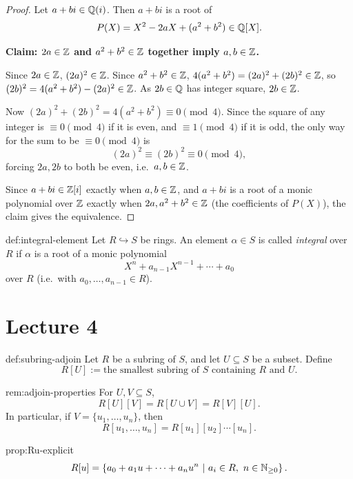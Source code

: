 \begin{proof}
Let $a + bi \in \mathbb{Q}(i)$. Then $a+bi$ is a root of
\[
P(X) = X^2 - 2aX + (a^2+b^2) \in \mathbb{Q}[X].
\]

\textbf{Claim: $2a \in \mathbb{Z}$ and $a^2+b^2 \in \mathbb{Z}$ together imply $a, b \in \mathbb{Z}$.}

Since $2a \in \mathbb{Z}$, $(2a)^2 \in \mathbb{Z}$. Since $a^2+b^2 \in \mathbb{Z}$, $4(a^2+b^2) = (2a)^2 + (2b)^2 \in \mathbb{Z}$, so $(2b)^2 = 4(a^2+b^2) - (2a)^2 \in \mathbb{Z}$. As $2b \in \mathbb{Q}$ has integer square, $2b \in \mathbb{Z}$.

Now $(2a)^2 + (2b)^2 = 4(a^2+b^2) \equiv 0 \pmod 4$. Since the square of any integer is $\equiv 0 \pmod 4$ if it is even, and $\equiv 1 \pmod 4$ if it is odd, the only way for the sum to be $\equiv 0 \pmod 4$ is
\[
(2a)^2 \equiv (2b)^2 \equiv 0 \pmod 4,
\]
forcing $2a, 2b$ to both be even, i.e.\ $a, b \in \mathbb{Z}$.

Since $a+bi \in \mathbb{Z}[i]$ exactly when $a, b \in \mathbb{Z}$, and $a+bi$ is a root of a monic polynomial over $\mathbb{Z}$ exactly when $2a, a^2+b^2 \in \mathbb{Z}$ (the coefficients of $P(X)$), the claim gives the equivalence.
\end{proof}

\begin{definition}{}{def:integral-element}
Let $R \hookrightarrow S$ be rings. An element $\alpha \in S$ is called \emph{integral} over $R$ if $\alpha$ is a root of a monic polynomial
\[
X^n + a_{n-1}X^{n-1} + \cdots + a_0
\]
over $R$ (i.e.\ with $a_0, \ldots, a_{n-1} \in R$).
\end{definition}

\section{Lecture 4}

\begin{definition}{}{def:subring-adjoin}
Let $R$ be a subring of $S$, and let $U \subseteq S$ be a subset. Define
\[
R[U] := \text{the smallest subring of } S \text{ containing } R \text{ and } U.
\]
\end{definition}

\begin{remark}{}{rem:adjoin-properties}
For $U, V \subseteq S$,
\[
R[U][V] = R[U \cup V] = R[V][U].
\]
In particular, if $V = \{u_1, \ldots, u_n\}$, then
\[
R[u_1, \ldots, u_n] = R[u_1][u_2] \cdots [u_n].
\]
\end{remark}

\begin{proposition}{}{prop:Ru-explicit}
\[
R[u] = \left\{ a_0 + a_1 u + \cdots + a_n u^n \ \middle|\ a_i \in R,\ n \in \mathbb{N}_{\geq 0} \right\}.
\]
\end{proposition}

